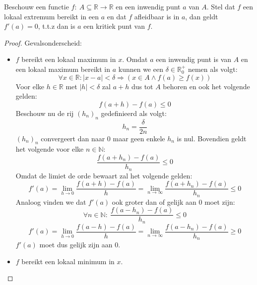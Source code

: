 \documentclass[main.tex]{subfiles}
\begin{document}
\begin{bpr}
  \label{pr:lokaal-extremum-is-kritiek-punt}
  Beschouw een functie $f:\ A \subseteq \mathbb{R} \rightarrow \mathbb{R}$ en een inwendig punt $a$ van $A$.
  Stel dat $f$ een lokaal extremum bereikt in een $a$ en dat $f$ afleidbaar is in $a$, dan geldt $f'(a) = 0$, t.t.z dan is $a$ een kritiek punt van $f$.

  \begin{proof}
    Gevalsonderscheid:
    \begin{itemize}
    \item $f$ bereikt een lokaal maximum in $x$.
      Omdat $a$ een inwendig punt is van $A$ en een lokaal maximum bereikt in $a$ kunnen we een $\delta \in \mathbb{R}_{0}^{+}$ nemen als volgt:
      \[ \forall x\in \mathbb{R}: |x-a| < \delta \Rightarrow (x\in A \wedge f(a) \ge f(x)) \]
      Voor elke $h\in \mathbb{R}$ met $|h| < \delta$ zal $a+h$ dus tot $A$ behoren en ook het volgende gelden:
      \[ f(a+h) -f(a) \le 0 \]
      Beschouw nu de rij $(h_{n})_{n}$ gedefinieerd als volgt:
      \[ h_{n} = \frac{\delta}{2n} \]
      $(h_{n})_{n}$ convergeert dan naar $0$ maar geen enkele $h_{n}$ is nul.
      Bovendien geldt het volgende voor elke $n\in \mathbb{N}$:
      \[ \frac{f(a+h_{n}) -f(a)}{h_{n}} \le 0 \]
      Omdat de limiet de orde bewaart zal het volgende gelden:
      \[ f'(a) = \lim_{h\rightarrow 0}\frac{f(a+h)-f(a)}{h} = \lim_{n \rightarrow \infty}\frac{f(a+h_{n})-f(a)}{h_{n}} \le 0 \]
      Analoog vinden we dat $f'(a)$ ook groter dan of gelijk aan $0$ moet zijn:
      \[ \forall n\in \mathbb{N}:\ \frac{f(a-h_{n}) -f(a)}{h_{n}} \le 0 \]
      \[ f'(a) = \lim_{h\rightarrow 0}\frac{f(a-h)-f(a)}{h} = \lim_{n \rightarrow \infty}\frac{f(a-h_{n})-f(a)}{h_{n}} \ge 0 \]
      $f'(a)$ moet dus gelijk zijn aan $0$.
    \item $f$ bereikt een lokaal minimum in $x$.
    \end{itemize}
  \end{proof}
\end{bpr}
\end{document}
